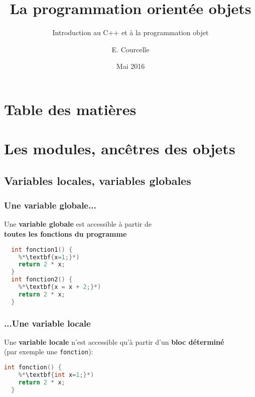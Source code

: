 \documentclass{beamer}
\title{La programmation orientée objets}
\subtitle{Introduction au C++ et à la programmation objet}
\author{E. Courcelle}\institute{CALMIP, UMS 3669}
\date{Mai 2016}
\begin{document}
  \begin{frame}
  \titlepage
  \end{frame}

  \section*{Table des matières}
  \begin{frame}
    \tableofcontents
  \end{frame}

  \section{Les modules, ancêtres des objets}

  \subsection{Variables locales, variables globales}
  \begin{frame}[fragile=singleslide,shrink=20]
  \frametitle {Une variable globale...}

  Une \textbf{variable globale} est accessible à partir de \\ \textbf{toutes les fonctions du programme}

  \begin{lstlisting}[language=c++]
  %*\textbf{int x=0};*)
  int fonction1() {
    %*\textbf{x=1;}*)
    return 2 * x;         
  }
  int fonction2() {
    %*\textbf{x = x + 2;}*)
    return 2 * x;         
  }  
  \end{lstlisting}
  
  \end{frame}

  \begin{frame}[fragile=singleslide,shrink=20]
  \frametitle {...Une variable locale}
  
  Une \textbf{variable locale} n'est accessible qu'à partir d'un \textbf{bloc déterminé} \\
  (par exemple une \texttt{fonction}):

  \begin{lstlisting}[language=c++]
  int fonction() {
    %*\textbf{int x=1;}*)
    return 2 * x;         
  }
  \end{lstlisting}
  \end{frame}
\end{document}
